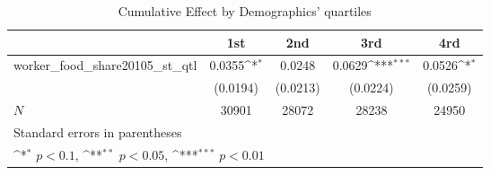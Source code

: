 \begin{table}[htbp]\centering
\def\sym#1{\ifmmode^{#1}\else\(^{#1}\)\fi}
\caption{Cumulative Effect by Demographics' quartiles}
\begin{tabular}{l*{4}{c}}
\hline\hline
            &\multicolumn{1}{c}{1st}&\multicolumn{1}{c}{2nd}&\multicolumn{1}{c}{3rd}&\multicolumn{1}{c}{4rd}\\
\hline
worker\_food\_share20105\_st\_qtl&      0.0355\sym{*}  &      0.0248         &      0.0629\sym{***}&      0.0526\sym{*}  \\
            &    (0.0194)         &    (0.0213)         &    (0.0224)         &    (0.0259)         \\
\hline
\(N\)       &       30901         &       28072         &       28238         &       24950         \\
\hline\hline
\multicolumn{5}{l}{\footnotesize Standard errors in parentheses}\\
\multicolumn{5}{l}{\footnotesize \sym{*} \(p<0.1\), \sym{**} \(p<0.05\), \sym{***} \(p<0.01\)}\\
\end{tabular}
\end{table}
